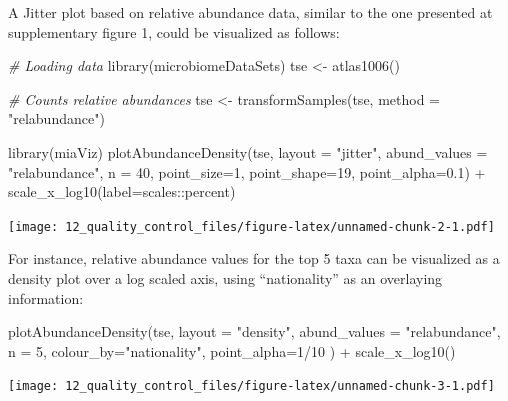 \documentclass[
]{book}
\newenvironment{Shaded}{\begin{snugshade}}{\end{snugshade}}
\newcommand{\AttributeTok}[1]{\textcolor[rgb]{0.77,0.63,0.00}{#1}}
\newcommand{\CommentTok}[1]{\textcolor[rgb]{0.56,0.35,0.01}{\textit{#1}}}
\newcommand{\DecValTok}[1]{\textcolor[rgb]{0.00,0.00,0.81}{#1}}
\newcommand{\FloatTok}[1]{\textcolor[rgb]{0.00,0.00,0.81}{#1}}
\newcommand{\FunctionTok}[1]{\textcolor[rgb]{0.00,0.00,0.00}{#1}}
\newcommand{\NormalTok}[1]{#1}
\newcommand{\OtherTok}[1]{\textcolor[rgb]{0.56,0.35,0.01}{#1}}
\newcommand{\SpecialCharTok}[1]{\textcolor[rgb]{0.00,0.00,0.00}{#1}}
\newcommand{\StringTok}[1]{\textcolor[rgb]{0.31,0.60,0.02}{#1}}
\begin{document}
A Jitter plot based on relative abundance data, similar to the one presented at
\citep{Salosensaari2021} supplementary figure 1, could be visualized as follows:

\begin{Shaded}
\begin{Highlighting}[]
\CommentTok{\# Loading data}
\FunctionTok{library}\NormalTok{(microbiomeDataSets)}
\NormalTok{tse }\OtherTok{\textless{}{-}} \FunctionTok{atlas1006}\NormalTok{()}

\CommentTok{\# Counts relative abundances}
\NormalTok{tse }\OtherTok{\textless{}{-}} \FunctionTok{transformSamples}\NormalTok{(tse, }\AttributeTok{method =} \StringTok{"relabundance"}\NormalTok{)}

\FunctionTok{library}\NormalTok{(miaViz)}
\FunctionTok{plotAbundanceDensity}\NormalTok{(tse, }\AttributeTok{layout =} \StringTok{"jitter"}\NormalTok{, }\AttributeTok{abund\_values =} \StringTok{"relabundance"}\NormalTok{,}
                     \AttributeTok{n =} \DecValTok{40}\NormalTok{, }\AttributeTok{point\_size=}\DecValTok{1}\NormalTok{, }\AttributeTok{point\_shape=}\DecValTok{19}\NormalTok{, }\AttributeTok{point\_alpha=}\FloatTok{0.1}\NormalTok{) }\SpecialCharTok{+} 
    \FunctionTok{scale\_x\_log10}\NormalTok{(}\AttributeTok{label=}\NormalTok{scales}\SpecialCharTok{::}\NormalTok{percent)}
\end{Highlighting}
\end{Shaded}

\texttt{[image: 12\_quality\_control\_files/figure-latex/unnamed-chunk-2-1.pdf]}

For instance, relative abundance values for the top 5 taxa can be
visualized as a density plot over a log scaled axis, using
``nationality'' as an overlaying information:

\begin{Shaded}
\begin{Highlighting}[]
\FunctionTok{plotAbundanceDensity}\NormalTok{(tse, }\AttributeTok{layout =} \StringTok{"density"}\NormalTok{, }\AttributeTok{abund\_values =} \StringTok{"relabundance"}\NormalTok{,}
                     \AttributeTok{n =} \DecValTok{5}\NormalTok{, }\AttributeTok{colour\_by=}\StringTok{"nationality"}\NormalTok{, }\AttributeTok{point\_alpha=}\DecValTok{1}\SpecialCharTok{/}\DecValTok{10}\NormalTok{ ) }\SpecialCharTok{+}
    \FunctionTok{scale\_x\_log10}\NormalTok{()}
\end{Highlighting}
\end{Shaded}

\texttt{[image: 12\_quality\_control\_files/figure-latex/unnamed-chunk-3-1.pdf]}
\end{document}

